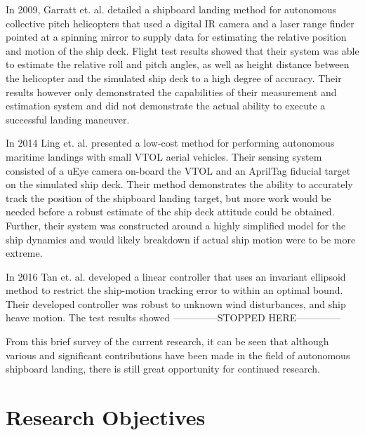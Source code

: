 \documentclass[12pt, letterpaper]{article}
\begin{document}

In 2009, Garratt et. al. \cite{Garratt2009} detailed a shipboard landing method for autonomous collective pitch helicopters that used a digital IR camera and a laser range finder pointed at a spinning mirror to supply data for estimating the relative position and motion of the ship deck.  Flight test results showed that their system was able to estimate the relative roll and pitch angles, as well as height distance between the helicopter and the simulated ship deck to a high degree of accuracy.  Their results however only demonstrated the capabilities of their measurement and estimation system and did not demonstrate the actual ability to execute a successful landing maneuver.
  
In 2014 Ling et. al. \cite{Ling2014} presented a low-cost method for performing autonomous maritime landings with small VTOL aerial vehicles.  Their sensing system consisted of a uEye camera on-board the VTOL and an AprilTag fiducial target on the simulated ship deck.  Their method demonstrates the ability to accurately track the position of the shipboard landing target, but more work would be needed before a robust estimate of the ship deck attitude could be obtained.  Further, their system was constructed around a highly simplified model for the ship dynamics and would likely breakdown if actual ship motion were to be more extreme.

In 2016 Tan et. al. \cite{Tan2016} developed a linear controller that uses an invariant ellipsoid method to restrict the ship-motion tracking error to within an optimal bound.  Their developed controller was robust to unknown wind disturbances, and ship heave motion.  The test results showed --------------STOPPED HERE--------------    


From this brief survey of the current research, it can be seen that although various and significant contributions have been made in the field of autonomous shipboard landing, there is still great opportunity for continued research.

\section{Research Objectives}
\end{document}
